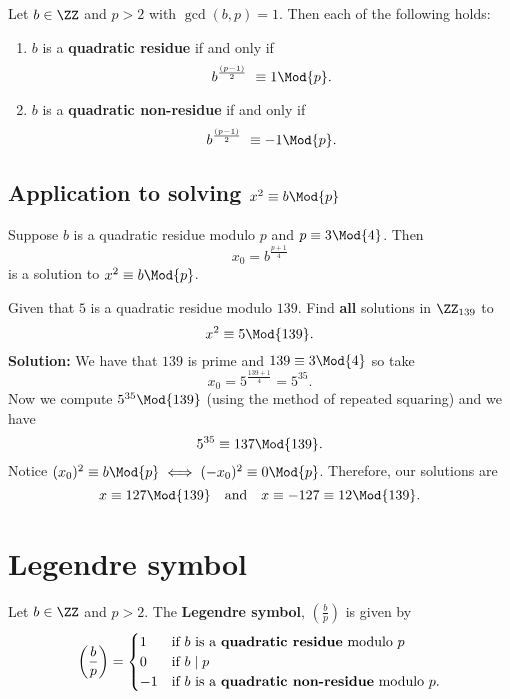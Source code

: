 \documentclass[12pt, a4paper]{article}
\begin{document}

\begin{mdthm}
    Let \(b \in \ZZ\) and \(p>2\) with \(\gcd(b,p)=1\). Then each of the following holds:
    \begin{enumerate}
        \item \(b\) is a \textbf{quadratic residue} if and only if
        \[b^{\frac{(p-1)}{2}}\ \equiv 1 \Mod{p}.\]
        \item \(b\) is a \textbf{quadratic non-residue} if and only if 
        \[b^{\frac{(p-1)}{2}}\ \equiv -1 \Mod{p}.\]
    \end{enumerate}
\end{mdthm}

\subsection{Application to solving \texorpdfstring{\(x^2 \equiv b \Mod{p}\)}{TEXT}}

\begin{mdprop}
    Suppose \(b\) is a quadratic residue modulo \(p\) and \(p \equiv 3 \Mod{4}\). Then 
    \[x_0 =b^{\frac{p+1}{4}}\]
    is a solution to \(x^2 \equiv b \Mod{p}\).
\end{mdprop}

\begin{mdexample}
    Given that \(5\) is a quadratic residue modulo \(139\). Find \textbf{all} solutions in \(\ZZ_{139}\) to
    \[x^2 \equiv 5 \Mod{139}.\]
    \textbf{Solution:} We have that \(139\) is prime and \(139 \equiv 3 \Mod{4}\) so take 
    \[x_0=5^{\frac{139+1}{4}} = 5^{35}.\]
    Now we compute \(5^{35} \Mod{139}\) (using the method of repeated squaring) and we have
    \[5^{35} \equiv 137 \Mod{139}.\]
    Notice \((x_0)^2 \equiv b \Mod{p} \iff (-x_0)^2 \equiv 0 \Mod{p}\). Therefore, our solutions are
    \[x\equiv 127 \Mod{139} \quad \text{and} \quad x\equiv -127 \equiv 12 \Mod{139}.\]
\end{mdexample}

\section{Legendre symbol}

\begin{definition}
    Let \(b\in \ZZ\) and \(p>2\). The \textbf{Legendre symbol}, \(\left( \frac{b}{p} \right)\) is given by 
    \[\begin{aligned}
        \left( \frac{b}{p} \right) =\begin{cases}
            1 &\text{if } b \text{ is a \textbf{quadratic residue} modulo } p \\
            0 &\text{if } b \mid p \\
            -1 &\text{if } b \text{ is a \textbf{quadratic non-residue} modulo } p.
        \end{cases}
    \end{aligned}\]
\end{definition}
\end{document}
